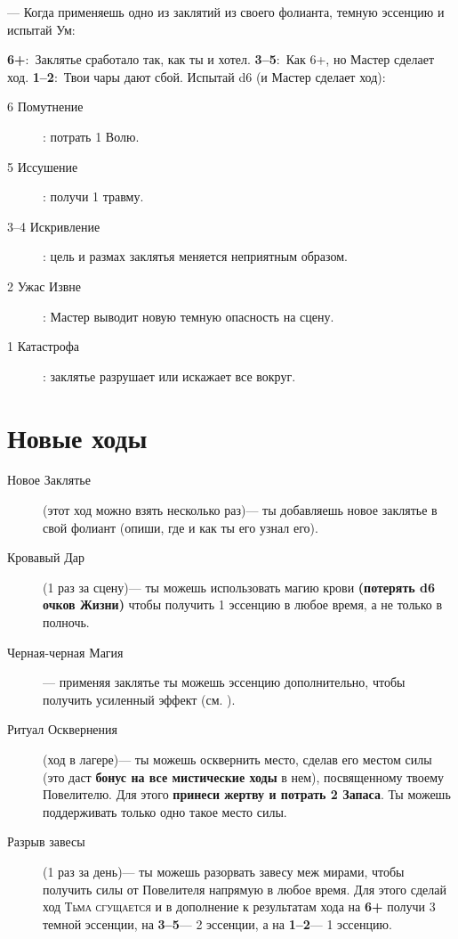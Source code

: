 \documentclass[10pt,twoside]{report}
\begin{document}
\begin{description}[noitemsep]
\item[Колдовство]--- Когда применяешь одно из заклятий из своего
  фолианта, { темную эссенцию и испытай Ум}:
  
 \textbf{6+}:~Заклятье сработало так, как ты и
хотел. \textbf{3--5}:~Как 6+, но Мастер сделает
ход.  \textbf{1--2}:~Твои чары дают сбой. Испытай d6 (и Мастер сделает ход):
  \begin{description}
\item[6 Помутнение]: потрать 1 Волю.
\item[5 Иссушение]: получи 1 травму.
\item[3--4 Искривление]: цель и размах заклятья меняется неприятным образом.
\item[2 Ужас Извне]: Мастер выводит новую темную опасность на сцену.
\item[1 Катастрофа]: заклятье разрушает или искажает все вокруг.
\end{description}
\end{description}
\vfill
\pagebreak

\section*{Новые ходы}
\begin{description}
\item[Новое Заклятье] (этот ход можно взять несколько раз)--- ты
  добавляешь новое заклятье в свой фолиант (опиши, где и как ты его узнал его).
\item[Кровавый Дар] (1 раз за сцену)--- ты можешь использовать магию
  крови {\bfseries (потерять d6 очков Жизни)} чтобы получить 1
  эссенцию в любое время, а не только в полночь.
\item[Черная-черная Магия]--- применяя заклятье ты можешь
  { эссенцию дополнительно}, чтобы получить усиленный эффект (см. {}).
\item[Ритуал Осквернения] (ход в лагере)--- ты можешь осквернить место,
  сделав его местом силы (это даст {\bfseries бонус на все мистические
    ходы} в нем), посвященному твоему Повелителю. Для этого {\bfseries
    принеси   жертву и потрать 2 Запаса}. Ты можешь поддерживать только одно такое место силы.
\item[Разрыв завесы] (1 раз за день)--- ты можешь разорвать завесу меж
  мирами, чтобы получить силы от Повелителя напрямую в любое
  время. Для этого сделай ход {\scshape Тьма сгущается} и в дополнение к результатам хода на \textbf{6+} получи 3 темной эссенции, на \textbf{3--5}--- 2 эссенции, а на \textbf{1--2}--- 1 эссенцию.
\end{description}
\pagebreak
\end{document}
